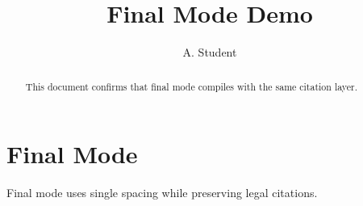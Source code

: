 \documentclass[review=generic,mode=final]{americanlawreview}
\title{Final Mode Demo}
\author{A. Student}
\begin{document}
\maketitle

\begin{abstract}
This document confirms that final mode compiles with the same citation layer.
\end{abstract}

\section{Final Mode}

Final mode uses single spacing while preserving legal citations.

\printbibliography
\end{document}
